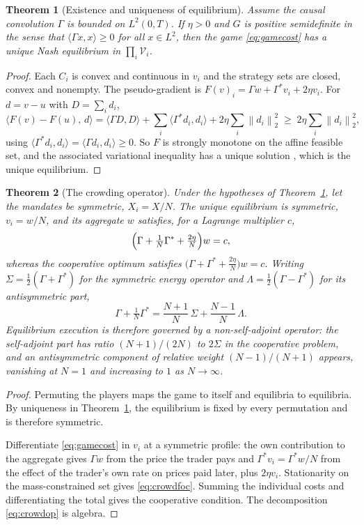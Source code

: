 \documentclass[11pt]{article}
\newcommand{\norm}[1]{\left\lVert #1\right\rVert}
\numberwithin{equation}{section}
\newtheorem{theorem}{Theorem}[section]
\theoremstyle{definition}
\theoremstyle{remark}
\theoremstyle{definition}
\begin{document}
\begin{theorem}[Existence and uniqueness of equilibrium]\label{thm:nash}
Assume the causal convolution $\Gamma$ is bounded on $L^2(0,T)$. If $\eta>0$ and $G$ is positive semidefinite in the sense that
$\langle\Gamma x,x\rangle\ge0$ for all $x\in L^2$, then the game
\eqref{eq:gamecost} has a unique Nash equilibrium in $\prod_i\mathcal V_i$.
\end{theorem}
\begin{proof}
Each $C_i$ is convex and continuous in $v_i$ and the strategy sets are closed,
convex and nonempty. The pseudo-gradient is
$F(v)_i=\Gamma w+\Gamma^*v_i+2\eta v_i$. For $d=v-u$ with $D=\sum_id_i$,
\[
 \langle F(v)-F(u),\,d\rangle
 =\langle\Gamma D,D\rangle+\sum_i\langle\Gamma^*d_i,d_i\rangle
 +2\eta\sum_i\norm{d_i}_2^2 \;\ge\;2\eta\sum_i\norm{d_i}_2^2 ,
\]
using $\langle\Gamma^*d_i,d_i\rangle=\langle\Gamma d_i,d_i\rangle\ge0$. So $F$
is strongly monotone on the affine feasible set, and the associated variational
inequality has a unique solution \citep{facchineipang2003}, which is the unique
equilibrium.
\end{proof}

\begin{theorem}[The crowding operator]\label{thm:crowding}
Under the hypotheses of Theorem~\ref{thm:nash}, let the mandates be
symmetric, $X_i=X/N$. The unique equilibrium is symmetric, $v_i=w/N$,
and its aggregate $w$ satisfies, for a Lagrange multiplier $c$,
\begin{equation}\label{eq:crowdfoc}
 \Bigl(\Gamma+\tfrac1N\Gamma^*+\tfrac{2\eta}N\Bigr)w=c ,
\end{equation}
whereas the cooperative optimum satisfies
$\bigl(\Gamma+\Gamma^*+\tfrac{2\eta}N\bigr)w=c$. Writing
$\Sigma=\tfrac12(\Gamma+\Gamma^*)$ for the symmetric energy operator and
$\Lambda=\tfrac12(\Gamma-\Gamma^*)$ for its antisymmetric part,
\begin{equation}\label{eq:crowdop}
 \Gamma+\tfrac1N\Gamma^*=\frac{N+1}{N}\,\Sigma+\frac{N-1}{N}\,\Lambda .
\end{equation}
Equilibrium execution is therefore governed by a non-self-adjoint operator: the
self-adjoint part has ratio $(N+1)/(2N)$ to $2\Sigma$ in the
cooperative problem, and an antisymmetric component of relative weight
$(N-1)/(N+1)$ appears, vanishing at $N=1$ and increasing to $1$ as
$N\to\infty$.
\end{theorem}
\begin{proof}
Permuting the players maps the game to itself and equilibria to equilibria.
By uniqueness in Theorem~\ref{thm:nash}, the equilibrium is fixed by every
permutation and is therefore symmetric.

Differentiate \eqref{eq:gamecost} in $v_i$ at a symmetric profile: the own
contribution to the aggregate gives $\Gamma w$ from the price the trader pays
and $\Gamma^*v_i=\Gamma^*w/N$ from the effect of the trader's own rate on prices
paid later, plus $2\eta v_i$. Stationarity on the mass-constrained set gives
\eqref{eq:crowdfoc}. Summing the individual costs and differentiating the total
gives the cooperative condition. The decomposition \eqref{eq:crowdop} is
algebra.
\end{proof}
\end{document}
